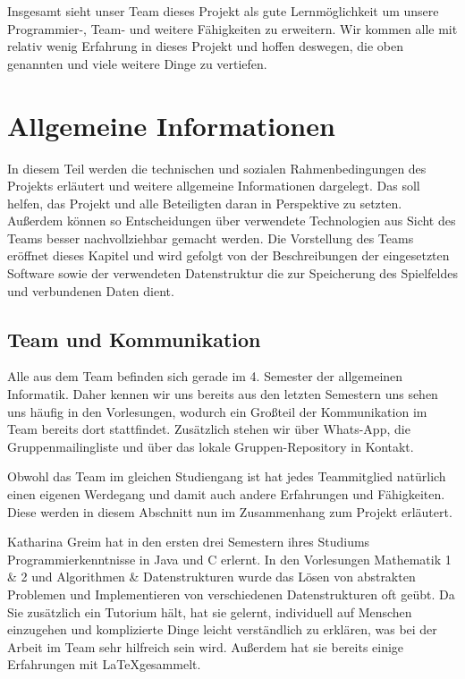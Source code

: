 \documentclass[12pt,a4paper,bibliography=totocnumbered,listof=totocnumbered]{scrartcl}
\begin{document}
Insgesamt sieht unser Team dieses Projekt als gute Lernmöglichkeit um unsere Programmier-, Team- und weitere Fähigkeiten zu erweitern. Wir kommen alle mit relativ wenig Erfahrung in dieses Projekt und hoffen deswegen, die oben genannten und viele weitere Dinge zu vertiefen.

\newpage
\section{Allgemeine Informationen}

In diesem Teil werden die technischen und sozialen Rahmenbedingungen des Projekts erläutert und weitere allgemeine Informationen dargelegt. Das soll helfen, das Projekt und alle Beteiligten daran in Perspektive zu setzten. Außerdem können so Entscheidungen über verwendete Technologien aus Sicht des Teams besser nachvollziehbar gemacht werden. Die Vorstellung des Teams eröffnet dieses Kapitel und wird gefolgt von der Beschreibungen der eingesetzten Software sowie der verwendeten Datenstruktur die zur Speicherung des Spielfeldes und verbundenen Daten dient.

\subsection{Team und Kommunikation}
Alle aus dem Team befinden sich gerade im 4. Semester der allgemeinen Informatik. Daher kennen wir uns bereits aus den letzten Semestern uns sehen uns häufig in den Vorlesungen, wodurch ein Großteil der Kommunikation im Team bereits dort stattfindet. Zusätzlich stehen wir über Whats-App, die Gruppenmailingliste und über das lokale Gruppen-Repository in Kontakt.

Obwohl das Team im gleichen Studiengang ist hat jedes Teammitglied natürlich einen eigenen Werdegang und damit auch andere Erfahrungen und Fähigkeiten. Diese werden in diesem Abschnitt nun im Zusammenhang zum Projekt erläutert.

Katharina Greim hat in den ersten drei Semestern ihres Studiums Programmierkenntnisse in Java und C erlernt. In den Vorlesungen Mathematik 1 \& 2 und Algorithmen \& Datenstrukturen wurde das Lösen von abstrakten Problemen und Implementieren von verschiedenen Datenstrukturen oft geübt. Da Sie zusätzlich ein Tutorium hält, hat sie gelernt, individuell auf Menschen einzugehen und komplizierte Dinge leicht verständlich zu erklären, was bei der Arbeit im Team sehr hilfreich sein wird. Außerdem hat sie bereits einige Erfahrungen mit \LaTeX\quad gesammelt. 
\end{document}
